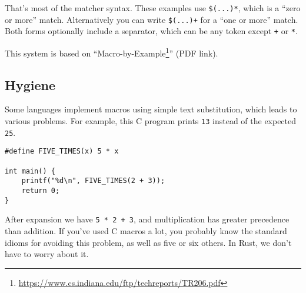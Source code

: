 \documentclass[a4paper,]{book}
\newenvironment{Shaded}{\begin{snugshade}}{\end{snugshade}}
\newcommand{\KeywordTok}[1]{\textcolor[rgb]{0.13,0.29,0.53}{\textbf{{#1}}}}
\newcommand{\DecValTok}[1]{\textcolor[rgb]{0.00,0.00,0.81}{{#1}}}
\newcommand{\OtherTok}[1]{\textcolor[rgb]{0.56,0.35,0.01}{{#1}}}
\newcommand{\NormalTok}[1]{{#1}}
\renewcommand{\href}[2]{#2\footnote{\url{#1}}}
\begin{document}
\begin{Shaded}
\end{Shaded}

That's most of the matcher syntax. These examples use \texttt{\$(...)*},
which is a ``zero or more'' match. Alternatively you can write
\texttt{\$(...)+} for a ``one or more'' match. Both forms optionally
include a separator, which can be any token except \texttt{+} or
\texttt{*}.

This system is based on
``\href{https://www.cs.indiana.edu/ftp/techreports/TR206.pdf}{Macro-by-Example}''
(PDF link).

\subsection{Hygiene}\label{hygiene}

Some languages implement macros using simple text substitution, which
leads to various problems. For example, this C program prints
\texttt{13} instead of the expected \texttt{25}.

\begin{verbatim}
#define FIVE_TIMES(x) 5 * x

int main() {
    printf("%d\n", FIVE_TIMES(2 + 3));
    return 0;
}
\end{verbatim}

After expansion we have \texttt{5\ *\ 2\ +\ 3}, and multiplication has
greater precedence than addition. If you've used C macros a lot, you
probably know the standard idioms for avoiding this problem, as well as
five or six others. In Rust, we don't have to worry about it.
\end{document}

